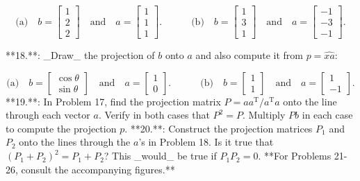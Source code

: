 \[\text{(a)}\quad b=\begin{bmatrix}1\\ 2\\ 2\end{bmatrix}\quad\text{and}\quad a=\begin{bmatrix}1\\ 1\\ 1\end{bmatrix}.\qquad\quad\text{(b)}\quad b=\begin{bmatrix}1\\ 3\\ 1\end{bmatrix}\quad\text{and}\quad a=\begin{bmatrix}-1\\ -3\\ -1\end{bmatrix}.\]

**18.**: _Draw_ the projection of \(b\) onto \(a\) and also compute it from \(p=\widehat{xa}\):

\[\text{(a)}\quad b=\begin{bmatrix}\cos\theta\\ \sin\theta\end{bmatrix}\quad\text{and}\quad a=\begin{bmatrix}1\\ 0\end{bmatrix}.\qquad\quad\text{(b)}\quad b=\begin{bmatrix}1\\ 1\end{bmatrix}\quad\text{and}\quad a=\begin{bmatrix}1\\ -1\end{bmatrix}.\]
**19.**: In Problem 17, find the projection matrix \(P=aa^{\mathrm{T}}/a^{\mathrm{T}}a\) onto the line through each vector \(a\). Verify in both cases that \(P^{2}=P\). Multiply \(Pb\) in each case to compute the projection \(p\).
**20.**: Construct the projection matrices \(P_{1}\) and \(P_{2}\) onto the lines through the \(a\)'s in Problem 18. Is it true that \((P_{1}+P_{2})^{2}=P_{1}+P_{2}\)? This _would_ be true if \(P_{1}P_{2}=0\).
**For Problems 21-26, consult the accompanying figures.**

